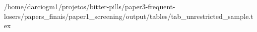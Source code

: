 /home/darciogm1/projetos/bitter-pills/paper3-frequent-losers/papers_finais/paper1_screening/output/tables/tab_unrestricted_sample.tex